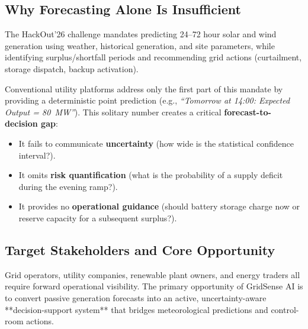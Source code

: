 \subsection{Why Forecasting Alone Is Insufficient}
\label{subsec:forecast_gap}

The HackOut'26 challenge mandates predicting 24--72 hour solar and wind generation using weather, historical generation, and site parameters, while identifying surplus/shortfall periods and recommending grid actions (curtailment, storage dispatch, backup activation).

Conventional utility platforms address only the first part of this mandate by providing a deterministic point prediction (e.g., \emph{``Tomorrow at 14:00: Expected Output = 80~MW''}). This solitary number creates a critical \textbf{forecast-to-decision gap}:
\begin{itemize}[leftmargin=1.5em, itemsep=0.15em]
    \item It fails to communicate \textbf{uncertainty} (how wide is the statistical confidence interval?).
    \item It omits \textbf{risk quantification} (what is the probability of a supply deficit during the evening ramp?).
    \item It provides no \textbf{operational guidance} (should battery storage charge now or reserve capacity for a subsequent surplus?).
\end{itemize}

\subsection{Target Stakeholders and Core Opportunity}
\label{subsec:target_stakeholders}

Grid operators, utility companies, renewable plant owners, and energy traders all require forward operational visibility. The primary opportunity of GridSense AI is to convert passive generation forecasts into an active, uncertainty-aware **decision-support system** that bridges meteorological predictions and control-room actions.
